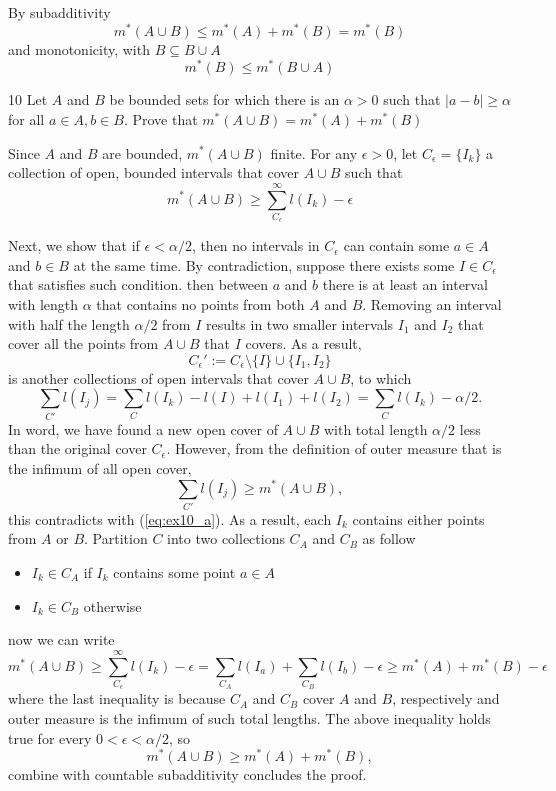 \begin{solution}
    By subadditivity
    \[m^*(A\cup B ) \leq m^*(A) + m^*(B) = m^*(B)\]
    and monotonicity, with $B\subseteq B\cup A$
    \[m^*(B)\leq m^*(B \cup A)\]
\end{solution}

\begin{exercise} {10}
    Let $A$ and $B$ be bounded sets for which there is an $\alpha>0$ such that $|a-b|\geq \alpha$ for all $a\in A, b\in B$. Prove that $m^*(A\cup B)=m^*(A) + m^*(B)$
\end{exercise}
\begin{solution} 
    Since $A$ and $B$ are bounded, $m^*(A\cup B)$ finite.
    For any $\epsilon>0$, let $C_\epsilon=\{I_k\}$ a collection of open, bounded intervals that cover $A\cup B$ such that
    \begin{equation}\label{eq:ex10_a}
        m^*(A\cup B) \geq \sum^\infty_{C_\epsilon} l(I_k) - \epsilon
    \end{equation}

    Next, we show that if $\epsilon < \alpha/2$, then no intervals in $C_\epsilon$ can contain some $a\in A$ and $b \in B$ at the same time.
    By contradiction, suppose there exists some $I\in C_\epsilon$ that satisfies such condition.
    then between $a$ and $b$ there is at least an interval with length $\alpha$ that contains no points from both $A$ and $B$. 
    Removing an interval with half the length $\alpha/2$ from $I$ results in two smaller intervals $I_1$ and $I_2$ that cover all the points from $A\cup B$ that $I$ covers. As a result,
    \[C_\epsilon' := C_\epsilon \setminus \{I\} \cup \{I_1, I_2\}\]
    is another collections of open intervals that cover $A\cup B$, to which 
    \[\sum_{C'}l(I_j) = \sum_{C}l(I_k) - l(I) + l(I_1) + l(I_2) = \sum_{C}l(I_k) - \alpha/2. \]
    In word, we have found a new open cover of $A\cup B$ with total length $\alpha/2$ less than the original cover $C_\epsilon$. However, from the definition of outer measure that is the infimum of all open cover,
    \[\sum_{C'}l(I_j) \geq m^*(A\cup B),\]
    this contradicts with (\ref{eq:ex10_a}). As a result, each $I_k$ contains either points from $A$ or $B$. Partition $C$ into two collections $C_A$ and $C_B$ as follow 
    \begin{itemize}
        \item $I_k \in C_A$ if $I_k$ contains some point $a\in A$
        \item $I_k \in C_B$ otherwise
    \end{itemize}
    now we can write 
    \[m^*(A\cup B) \geq \sum^\infty_{C_\epsilon} l(I_k) - \epsilon = \sum_{C_A} l(I_a) + \sum_{C_B} l(I_b) - \epsilon \geq m^*(A) + m^*(B) - \epsilon\]
    where the last inequality is because $C_A$ and $C_B$ cover $A$ and $B$, respectively and outer measure is the infimum of such total lengths. The above inequality holds true for every $0 < \epsilon < \alpha/2$, so
    \[m^*(A\cup B) \geq m^*(A) + m^*(B),\]
    combine with countable subadditivity concludes the proof.


\end{solution}
